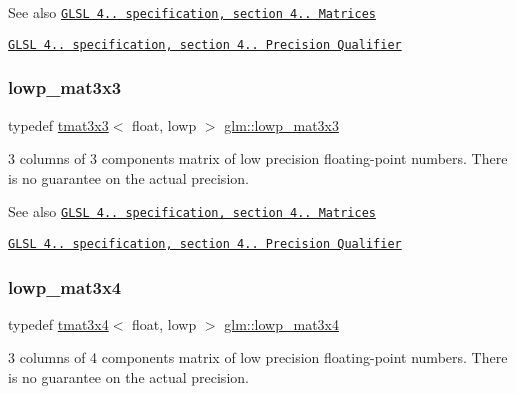 \begin{DoxySeeAlso}{See also}
\href{http://www.opengl.org/registry/doc/GLSLangSpec.4.20.8.pdf}{\tt G\+L\+SL 4.. specification, section 4.. Matrices} 

\href{http://www.opengl.org/registry/doc/GLSLangSpec.4.20.8.pdf}{\tt G\+L\+SL 4.. specification, section 4.. Precision Qualifier} 
\end{DoxySeeAlso}
\mbox{\label{group__core__precision_ga8d591be4ef2bf3bbcd7473c3eadeaf55}} 
\subsubsection{\texorpdfstring{lowp\+\_\+mat3x3}{lowp\_mat3x3}}
{\footnotesize\ttfamily typedef \hyperlink{structglm_1_1tmat3x3}{tmat3x3}$<$ float, lowp $>$ \hyperlink{group__core__precision_ga8d591be4ef2bf3bbcd7473c3eadeaf55}{glm\+::lowp\+\_\+mat3x3}}

3 columns of 3 components matrix of low precision floating-\/point numbers. There is no guarantee on the actual precision.

\begin{DoxySeeAlso}{See also}
\href{http://www.opengl.org/registry/doc/GLSLangSpec.4.20.8.pdf}{\tt G\+L\+SL 4.. specification, section 4.. Matrices} 

\href{http://www.opengl.org/registry/doc/GLSLangSpec.4.20.8.pdf}{\tt G\+L\+SL 4.. specification, section 4.. Precision Qualifier} 
\end{DoxySeeAlso}
\mbox{\label{group__core__precision_ga06b2903b2f784e0e74e58f25e9b79b15}} 
\subsubsection{\texorpdfstring{lowp\+\_\+mat3x4}{lowp\_mat3x4}}
{\footnotesize\ttfamily typedef \hyperlink{structglm_1_1tmat3x4}{tmat3x4}$<$ float, lowp $>$ \hyperlink{group__core__precision_ga06b2903b2f784e0e74e58f25e9b79b15}{glm\+::lowp\+\_\+mat3x4}}

3 columns of 4 components matrix of low precision floating-\/point numbers. There is no guarantee on the actual precision.

